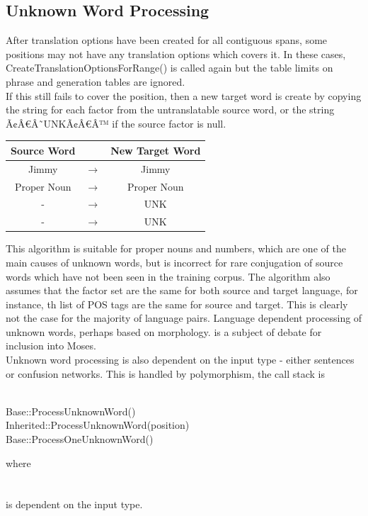 \documentclass[11pt]{report}
\theoremstyle{plain}
\begin{document}
{\subsection{Unknown Word Processing}
After translation options have been created for all contiguous spans, some positions may not have any translation options which covers it. In these cases, CreateTranslationOptionsForRange() is called again but the table limits on phrase and generation tables are ignored. \\
If this still fails to cover the position, then a new target word is create by copying the string for each factor from the untranslatable source word, or the string Ã¢Â€Â˜UNKÃ¢Â€Â™ if the source factor is null.\\
\begin{center}
\begin{tabular}{|c|c|c|}
\hline
Source Word & & New Target Word \\ \hline
Jimmy	& 	$\to$	& Jimmy\\
Proper Noun	& $\to$	& Proper Noun\\
-	& $\to$	& UNK\\
-	& $\to$	& UNK\\ \hline
\end{tabular}
\end{center}

This algorithm is suitable for proper nouns and numbers, which are one of the main causes of unknown words, but is incorrect for rare conjugation of source words which have not been seen in the training corpus. The algorithm also assumes that the factor set are the same for both source and target language, for instance, th list of POS tags are the same for source and target. This is clearly not the case for the majority of language pairs. Language dependent processing of unknown words, perhaps based on morphology. is a subject of debate for inclusion into Moses.\\
Unknown word processing is also dependent on the input type - either sentences or confusion networks. This is handled by polymorphism, the call stack is\\
\\
\begin{tt}
\indent	Base::ProcessUnknownWord()\\
\indent \indent	Inherited::ProcessUnknownWord(position)\\
\indent \indent \indent	Base::ProcessOneUnknownWord()\\
\end{tt}
where\\
\\
\\
is dependent on the input type.
}
\end{document}
